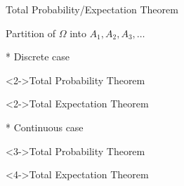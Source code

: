 \begin{frame}{Total Probability/Expectation Theorem}

Partition of $\Omega$ into $A_1,A_2,A_3, \ldots$

\medskip

{
\small
* Discrete case
\medskip

\begin{block}<2->{Total Probability Theorem}
 \end{block}

\begin{block}<2->{Total Expectation Theorem}
\end{block}
}
{
\small
* Continuous case
\medskip


\begin{block}<3->{Total Probability Theorem}
 \end{block}

\begin{block}<4->{Total Expectation Theorem}
\end{block}
}

\end{frame}

